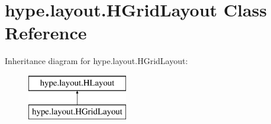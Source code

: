 \hypertarget{classhype_1_1layout_1_1_h_grid_layout}{\section{hype.\-layout.\-H\-Grid\-Layout Class Reference}
\label{classhype_1_1layout_1_1_h_grid_layout}
}
Inheritance diagram for hype.\-layout.\-H\-Grid\-Layout\-:\begin{figure}[H]
\begin{center}
\leavevmode
\includegraphics[height=2.000000cm]{classhype_1_1layout_1_1_h_grid_layout}
\end{center}
\end{figure}
